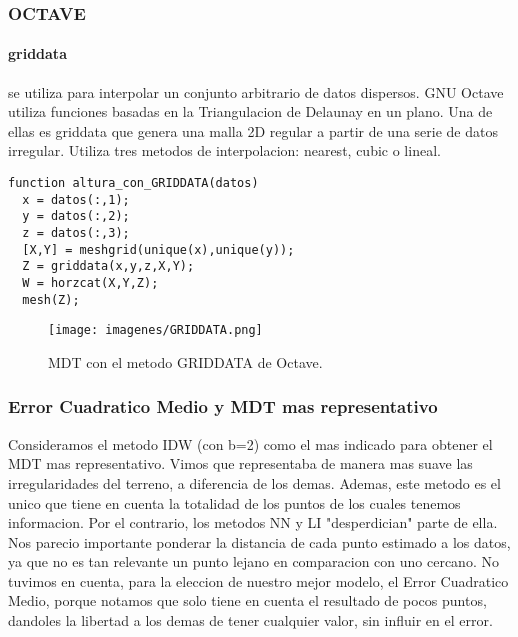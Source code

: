 \documentclass{article}
\begin{document}
\subsubsection{OCTAVE}
\paragraph{griddata} se utiliza para interpolar un conjunto arbitrario
de datos dispersos. GNU Octave utiliza funciones basadas en la
Triangulacion de Delaunay en un plano. Una de ellas es griddata que
genera una malla 2D regular a partir de una serie de datos irregular.
Utiliza tres metodos de interpolacion: nearest, cubic o lineal.
\begin{verbatim}
function altura_con_GRIDDATA(datos)
  x = datos(:,1);
  y = datos(:,2);
  z = datos(:,3);
  [X,Y] = meshgrid(unique(x),unique(y));
  Z = griddata(x,y,z,X,Y);
  W = horzcat(X,Y,Z);
  mesh(Z);
\end{verbatim}
\begin{figure}[H]
  \centering
  \texttt{[image: imagenes/GRIDDATA.png]}
  \caption{MDT con el metodo GRIDDATA de Octave.}
  \label{fig:mdt-nn}
\end{figure}





\subsubsection{Error Cuadratico Medio y MDT mas representativo}
Consideramos el metodo IDW (con b=2) como el mas indicado para obtener el MDT
mas representativo. Vimos que representaba de manera mas suave las
irregularidades del terreno, a diferencia de los demas.
Ademas, este metodo es el unico que tiene en cuenta la totalidad de
los puntos de los cuales tenemos informacion. Por el contrario, los
metodos NN y LI "desperdician" parte de ella.
Nos parecio importante ponderar la distancia de cada punto
estimado a los datos, ya que no es tan relevante un punto lejano en
comparacion con uno cercano.
No tuvimos en cuenta, para la eleccion de nuestro mejor modelo, el
Error Cuadratico Medio, porque notamos que solo tiene en cuenta el
resultado de pocos puntos, dandoles la libertad a los demas de tener
cualquier valor, sin influir en el error.
\end{document}
